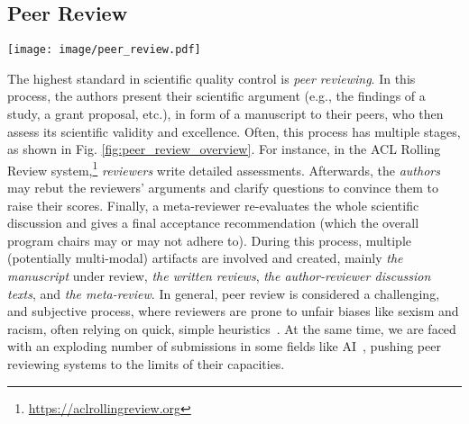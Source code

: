 \subsection{Peer Review}
\label{sec:peer_review}

\begin{figure*}[htbp]
  \centering
  \texttt{[image: image/peer\_review.pdf]}
  \caption{Process of AI-enhanced peer review. In the analysis step, the LLM reviewer examines research manuscripts and evaluates peer reviews to assess scientific rigor. The review step involves providing feedback on the paper and verifying scientific claims. Finally, the gathered information is synthesized to generate a final meta-review. } 
  \label{fig:peer_review_overview}
\end{figure*}

The highest standard in scientific quality control is \emph{peer reviewing}. In this process, the authors present their scientific argument (e.g., the findings of a study, a grant proposal, etc.), in form of a manuscript to their peers, who then assess its scientific validity and excellence. Often, this process has multiple stages, as shown in Fig. \ref{fig:peer_review_overview}. For instance, in the ACL Rolling Review system,\footnote{\url{https://aclrollingreview.org}} \emph{reviewers} write detailed assessments. Afterwards, the \emph{authors} may rebut the reviewers' arguments and clarify questions to convince them to raise their scores. Finally, a meta-reviewer re-evaluates the whole scientific discussion and gives a final acceptance recommendation (which the overall program chairs may or may not adhere to). During this process, multiple (potentially multi-modal) artifacts are involved and created, mainly \emph{the manuscript} under review, \emph{the written reviews}, \emph{the author-reviewer discussion texts}, and \emph{the meta-review}. 
In general, peer review is considered a challenging, and  subjective process, where reviewers are prone to unfair biases like sexism and racism, often relying on quick, simple heuristics~\cite[e.g.,][]{strauss2023racism, regner2019committees}. At the same time, we are faced with an exploding number of submissions in some fields like AI~\cite{kunzli2022not}, pushing peer reviewing systems to the limits of their capacities.


